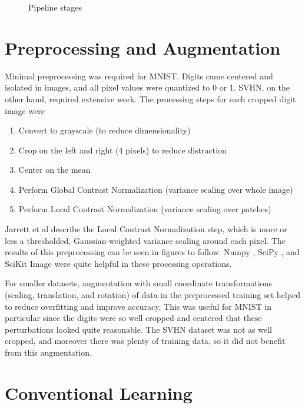 \documentclass{article}
\begin{document}
\begin{figure}[htbp]
  \centering
  
  \caption{Pipeline stages}
  \label{fig:pipeline}
\end{figure}

\section{Preprocessing and Augmentation}

Minimal preprocessing was required for MNIST. Digits came centered and isolated in images, and all pixel values were quantized to 0 or 1. SVHN, on the other hand, required extensive work. The processing steps for each cropped digit image were

\begin{enumerate}
  \item Convert to grayscale (to reduce dimensionality)
  \item Crop on the left and right (4 pixels) to reduce distraction
  \item Center on the mean
  \item Perform Global Contrast Normalization (variance scaling over whole image)
  \item Perform Local Contrast Normalization (variance scaling over patches)
\end{enumerate}

Jarrett et al \cite{jarrett2009best} describe the Local Contrast Normalization step, which is more or less a thresholded, Gaussian-weighted variance scaling around each pixel. The results of this preprocessing can be seen in figures to follow. Numpy \cite{van2011numpy}, SciPy \cite{scipy}, and SciKit Image \cite{van2014scikit} were quite helpful in these processing operations.

For smaller datasets, augmentation with small coordinate transformations (scaling, translation, and rotation) of data in the preprocessed training set helped to reduce overfitting and improve accuracy. This was useful for MNIST in particular since the digits were so well cropped and centered that these perturbations looked quite reasonable. The SVHN dataset was not as well cropped, and moreover there was plenty of training data, so it did not benefit from this augmentation.

\section{Conventional Learning}
\end{document}
